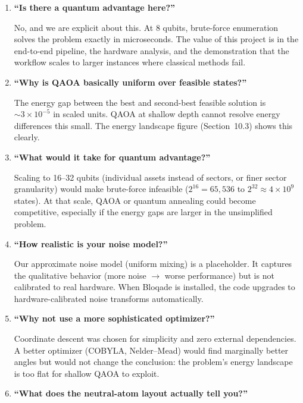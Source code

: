 \documentclass[12pt, a4paper]{article}
\begin{document}
\begin{enumerate}
    \item \textbf{``Is there a quantum advantage here?''}

    No, and we are explicit about this. At 8 qubits, brute-force enumeration
    solves the problem exactly in microseconds. The value of this project is in
    the end-to-end pipeline, the hardware analysis, and the demonstration that
    the workflow scales to larger instances where classical methods fail.

    \item \textbf{``Why is QAOA basically uniform over feasible states?''}

    The energy gap between the best and second-best feasible solution is
    $\sim 3 \times 10^{-5}$ in scaled units. QAOA at shallow depth cannot
    resolve energy differences this small. The energy landscape figure
    (Section~10.3) shows this clearly.

    \item \textbf{``What would it take for quantum advantage?''}

    Scaling to 16--32 qubits (individual assets instead of sectors, or finer
    sector granularity) would make brute-force infeasible ($2^{16} = 65{,}536$
    to $2^{32} \approx 4 \times 10^9$ states). At that scale, QAOA or quantum
    annealing could become competitive, especially if the energy gaps are larger
    in the unsimplified problem.

    \item \textbf{``How realistic is your noise model?''}

    Our approximate noise model (uniform mixing) is a placeholder. It captures
    the qualitative behavior (more noise $\to$ worse performance) but is not
    calibrated to real hardware. When Bloqade is installed, the code upgrades
    to hardware-calibrated noise transforms automatically.

    \item \textbf{``Why not use a more sophisticated optimizer?''}

    Coordinate descent was chosen for simplicity and zero external dependencies.
    A better optimizer (COBYLA, Nelder--Mead) would find marginally better angles
    but would not change the conclusion: the problem's energy landscape is too
    flat for shallow QAOA to exploit.

    \item \textbf{``What does the neutral-atom layout actually tell you?''}


\end{enumerate}
\end{document}
